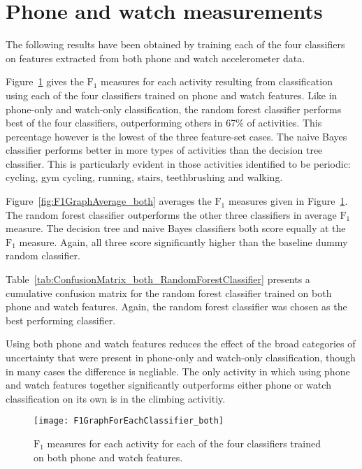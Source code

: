   
  \section{Phone and watch measurements}
    The following results have been obtained by training each of the four classifiers on features extracted from both phone and watch accelerometer data.
    
    Figure~\ref{fig:F1GraphForEachClassifier_both} gives the $\mathrm{F}_1$ measures for each activity resulting from classification using each of the four classifiers trained on phone and watch features. Like in phone-only and watch-only classification, the random forest classifier performs best of the four classifiers, outperforming others in 67\% of activities. This percentage however is the lowest of the three feature-set cases. The naive Bayes classifier performs better in more types of activities than the decision tree classifier. This is particularly evident in those activities identified to be  periodic: cycling, gym cycling, running, stairs, teethbrushing and walking.
    
    Figure~\ref{fig:F1GraphAverage_both} averages the $\mathrm{F}_1$ measures given in Figure~\ref{fig:F1GraphForEachClassifier_both}. The random forest classifier outperforms the other three classifiers in average $\mathrm{F}_1$ measure. The decision tree and naive Bayes classifiers both score equally at the $\mathrm{F}_1$ measure. Again, all three score significantly higher than the baseline dummy random classifier.
    
    Table~\ref{tab:ConfusionMatrix_both_RandomForestClassifier} presents a cumulative confusion matrix for the random forest classifier trained on both phone and watch features. Again, the random forest classifier was chosen as the best performing classifier.
    
    Using both phone and watch features reduces the effect of the broad categories of uncertainty that were present in phone-only and watch-only classification, though in many cases the difference is negliable. The only activity in which using phone and watch features together significantly outperforms either phone or watch classification on its own is in the climbing activitiy.
    
    \begin{figure}
      \centering
      \texttt{[image: F1GraphForEachClassifier\_both]}
      \caption{$\mathrm{F}_1$ measures for each activity for each of the four classifiers trained on both phone and watch features.}
      \label{fig:F1GraphForEachClassifier_both}
    \end{figure}
    
